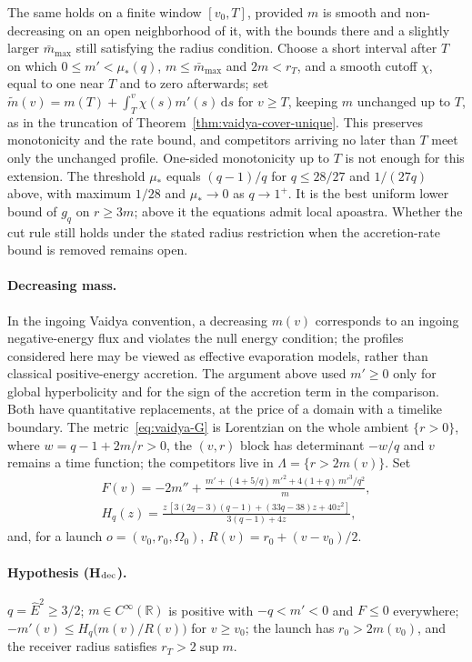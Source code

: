 \documentclass[aip,jmp,amsmath,amssymb,reprint]{revtex4-2}
\newcommand{\Ehat}{\hat E}
\newcommand{\dd}{\mathrm{d}}
\theoremstyle{plain}
\theoremstyle{definition}
\begin{document}
The same holds on a finite window $[v_0,T]$, provided $m$ is smooth and non-decreasing on an open
neighborhood of it, with the bounds there and a slightly larger $\bar m_{\max}$ still satisfying the radius
condition. Choose a short interval after $T$ on which $0\le m'<\mu_*(q)$, $m\le\bar m_{\max}$ and $2m<r_T$, and a smooth cutoff
$\chi$, equal to one near $T$ and to zero afterwards; set $\widetilde m(v)=m(T)+\int_T^v\chi(s)m'(s)\,\dd s$ for $v\ge T$,
keeping $m$ unchanged up to $T$, as in the truncation of Theorem~\ref{thm:vaidya-cover-unique}. This preserves
monotonicity and the rate bound, and competitors arriving no later than $T$ meet only the unchanged
profile. One-sided monotonicity up to $T$ is not enough for this extension. The threshold $\mu_*$ equals $(q-1)/q$ for $q\le28/27$ and $1/(27q)$ above,
with maximum $1/28$ and $\mu_*\to0$ as $q\to1^+$. It is the best uniform lower bound of $g_q$ on $r\ge3m$; above it the
equations admit local apoastra. Whether the cut rule still holds under the stated radius restriction when
the accretion-rate bound is removed remains open.

\paragraph{Decreasing mass.} In the ingoing Vaidya convention, a decreasing $m(v)$ corresponds to
an ingoing negative-energy flux and violates the null energy condition; the profiles considered
here may be viewed as effective evaporation models, rather than classical positive-energy
accretion. The argument above used $m'\ge0$ only for global hyperbolicity and for the sign of the
accretion term in the comparison. Both have quantitative replacements, at the price of a domain
with a timelike boundary. The metric~\eqref{eq:vaidya-G} is Lorentzian on the whole ambient
$\{r>0\}$, where $w=q-1+2m/r>0$, the $(v,r)$ block has determinant $-w/q$ and $v$ remains a time
function; the competitors live in $\Lambda=\{r>2m(v)\}$. Set
\begin{gather*}
  F(v)=-2m''+\frac{m'+(4+5/q)\,m'^2+4(1+q)\,m'^3/q^2}{m},\\
  H_q(z)=\frac{z\,[3(2q-3)(q-1)+(33q-38)z+40z^2]}{3(q-1)+4z},
\end{gather*}
and, for a launch $o=(v_0,r_0,\Omega_0)$, $R(v)=r_0+(v-v_0)/2$.

\paragraph{Hypothesis (H$_{\rm dec}$).} $q=\Ehat^2\ge3/2$; $m\in C^\infty(\mathbb R)$ is positive with
$-q<m'<0$ and $F\le0$ everywhere; $-m'(v)\le H_q\big(m(v)/R(v)\big)$ for $v\ge v_0$; the launch has
$r_0>2m(v_0)$, and the receiver radius satisfies $r_T>2\sup m$.
\end{document}
